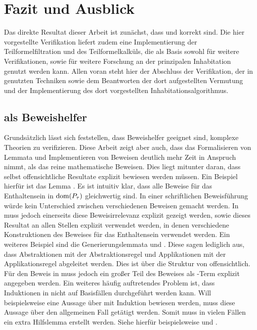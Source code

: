 \chapter{Fazit und Ausblick}

Das direkte Resultat dieser Arbeit ist zunächst, dass  und  korrekt sind. Die hier vorgestellte Verifikation liefert zudem eine Implementierung der Teilformelfiltration und des Teilformelkalküls, die als Basis sowohl für weitere Verifikationen, sowie für weitere Forschung an der prinzipalen Inhabitation genutzt werden kann. Allen voran steht hier der Abschluss der Verifikation, der in \cite{dudenhefner} genutzten Techniken sowie dem Beantworten der dort aufgestellten Vermutung und der Implementierung des dort vorgestellten Inhabitationsalgorithmus.

\section{\coq{} als Beweishelfer}
Grundsätzlich lässt sich feststellen, dass Beweishelfer geeignet sind, komplexe Theorien zu verifizieren. Diese Arbeit zeigt aber auch, dass das Formalisieren von Lemmata und Implementieren von Beweisen deutlich mehr Zeit in Anspruch nimmt, als das reine mathematische Beweisen. Dies liegt mitunter daran, dass selbst offensichtliche Resultate explizit bewiesen werden müssen. Ein Beispiel hierfür ist das Lemma . Es ist intuitiv klar, dass alle Beweise für das Enthaltensein in $\text{dom}(P_\tau)$ gleichwertig sind. In einer schriftlichen Beweisführung würde kein Unterschied zwischen verschiedenen Beweisen gemacht werden. In \coq{} muss jedoch einerseits diese Beweisirrelevanz explizit gezeigt werden, sowie dieses Resultat an allen Stellen explizit verwendet werden, in denen verschiedene Konstruktionen des Beweises für das Enthaltensein verwendet werden. Ein weiteres Beispiel sind die Generierungslemmata  und . Diese sagen lediglich aus, dass Abstraktionen mit der Abstraktionsregel und Applikationen mit der Applikationsregel abgeleitet werden. Dies ist über die Struktur von  offensichtlich. Für den Beweis in \coq{} muss jedoch ein großer Teil des Beweises als \tlambda-Term explizit angegeben werden. Ein weiteres häufig auftretendes Problem ist, dass Induktionen in \coq{} nicht auf Basisfällen durchgeführt werden kann. Will beispielsweise eine Aussage über  mit Induktion bewiesen werden, muss diese Aussage über den allgemeinen Fall  getätigt werden. Somit muss in vielen Fällen ein extra Hilfslemma erstellt werden. Siehe hierfür beispielsweise  und .

